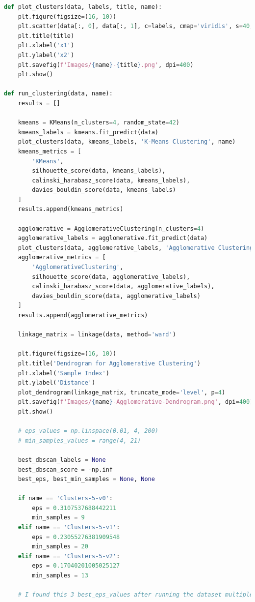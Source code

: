 \begin{lstlisting}[language=Python, caption=Code to Cluster Datasets and generate Metrics]
def plot_clusters(data, labels, title, name):
    plt.figure(figsize=(16, 10))
    plt.scatter(data[:, 0], data[:, 1], c=labels, cmap='viridis', s=40, edgecolors='black')
    plt.title(title)
    plt.xlabel('x1')
    plt.ylabel('x2')
    plt.savefig(f'Images/{name}-{title}.png', dpi=400)
    plt.show()

def run_clustering(data, name):
    results = []
    
    kmeans = KMeans(n_clusters=4, random_state=42)
    kmeans_labels = kmeans.fit_predict(data)
    plot_clusters(data, kmeans_labels, 'K-Means Clustering', name)
    kmeans_metrics = [
        'KMeans',
        silhouette_score(data, kmeans_labels),
        calinski_harabasz_score(data, kmeans_labels),
        davies_bouldin_score(data, kmeans_labels)
    ]
    results.append(kmeans_metrics)

    agglomerative = AgglomerativeClustering(n_clusters=4)
    agglomerative_labels = agglomerative.fit_predict(data)
    plot_clusters(data, agglomerative_labels, 'Agglomerative Clustering', name)
    agglomerative_metrics = [
        'AgglomerativeClustering',
        silhouette_score(data, agglomerative_labels),
        calinski_harabasz_score(data, agglomerative_labels),
        davies_bouldin_score(data, agglomerative_labels)
    ]
    results.append(agglomerative_metrics)

    linkage_matrix = linkage(data, method='ward')

    plt.figure(figsize=(16, 10))
    plt.title('Dendrogram for Agglomerative Clustering')
    plt.xlabel('Sample Index')
    plt.ylabel('Distance')
    plot_dendrogram(linkage_matrix, truncate_mode='level', p=4)
    plt.savefig(f'Images/{name}-Agglomerative-Dendrogram.png', dpi=400)
    plt.show()

    # eps_values = np.linspace(0.01, 4, 200)
    # min_samples_values = range(4, 21)

    best_dbscan_labels = None
    best_dbscan_score = -np.inf
    best_eps, best_min_samples = None, None

    if name == 'Clusters-5-v0':
        eps = 0.3107537688442211
        min_samples = 9
    elif name == 'Clusters-5-v1':
        eps = 0.23055276381909548
        min_samples = 20
    elif name == 'Clusters-5-v2':
        eps = 0.17040201005025127
        min_samples = 13

    # I found this 3 best_eps_values after running the dataset multiple times and checking the best silhouette score


\end{lstlisting}
